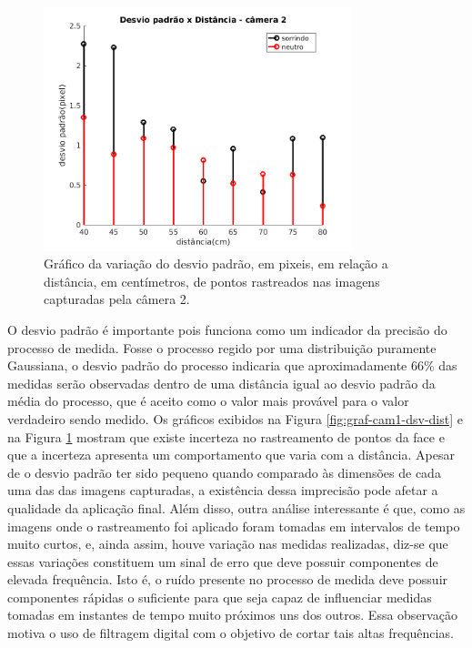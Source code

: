 \begin{figure}[!htb]
\centering
\includegraphics[width=0.8\textwidth]{figs/thumbnail_cameraDireita.jpg} 

\caption{Gráfico da variação do desvio padrão, em pixeis, em relação a
distância, em centímetros, de pontos rastreados nas imagens capturadas pela
câmera 2.}

\label{fig:graf-cam2-dsv-dist}
\end{figure}

O desvio padrão é importante pois funciona como um indicador da precisão do
processo de medida. Fosse o processo regido por uma distribuição puramente
Gaussiana, o desvio padrão do processo indicaria que aproximadamente 66\% das
medidas serão observadas dentro de uma distância igual ao desvio padrão da média
do processo, que é aceito como o valor mais provável para o valor verdadeiro
sendo medido.  Os gráficos exibidos na Figura \ref{fig:graf-cam1-dsv-dist} e na
Figura \ref{fig:graf-cam2-dsv-dist} mostram que existe incerteza no rastreamento
de pontos da face e que a incerteza apresenta um comportamento que varia com a
distância. Apesar de o desvio padrão ter sido pequeno quando comparado às
dimensões de cada uma das das imagens capturadas, a existência dessa imprecisão
pode afetar a qualidade da aplicação final. Além disso, outra análise
interessante é que, como as imagens onde o rastreamento foi aplicado foram
tomadas em intervalos de tempo muito curtos, e, ainda assim, houve variação nas
medidas realizadas, diz-se que essas variações constituem um sinal de erro que
deve possuir componentes de elevada frequência. Isto é, o ruído presente no
processo de medida deve possuir componentes rápidas o suficiente para que seja
capaz de influenciar medidas tomadas em instantes de tempo muito próximos uns
dos outros. Essa observação motiva o uso de filtragem digital com o objetivo de
cortar tais altas frequências.

